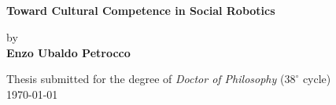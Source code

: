 
\thispagestyle{empty}
\begin{figure}[h!]
 \centering
 		  \vspace{-0.5em}
	\begin{center} 
		\large {
		{}}\\
		  \vspace{2em}
		  {\huge {}}\\
               \vspace{1.5em}
            \large {\\
               \vspace{0.5em}
       		{}}\\

	\end{center}
\end{figure}



\begin{center} 
	


		\LARGE
		\textbf{Toward Cultural Competence in Social Robotics} \\
\end{center}

 	\begin{center} 
		by \\
		\vspace{0.5em}
		\textbf{Enzo Ubaldo Petrocco}\\
		\vspace{1em}
	
		
	\vspace{0.5cm}	
		\normalsize
		Thesis submitted for the degree of \textit{Doctor of Philosophy} ($38^\circ$ cycle) \\
		\normalsize
		\today\\ 
	\end{center}
	\vspace{1.5em}

